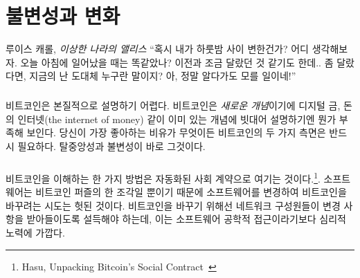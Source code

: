 \chapter{불변성과 변화}
\label{les:1}

\begin{chapquote}{루이스 캐롤, \textit{이상한 나라의 앨리스}}
	\enquote{혹시 내가 하룻밤 사이 변한건가? 어디 생각해보자.
		오늘 아침에 일어났을 때는 똑같았나? 이전과 조금 달랐던 것 같기도 한데.. 
		좀 달랐다면, 지금의 난 도대체 누구란 말이지? 아, 정말 알다가도 모를 일이네!}
\end{chapquote}

\paragraph{}
비트코인은 본질적으로 설명하기 어렵다. 
비트코인은 \textit{새로운 개념}이기에 디지털 금, 돈의 인터넷(the internet of money) 같이 이미 있는 개념에 빗대어 설명하기엔 뭔가 부족해 보인다. 
당신이 가장 좋아하는 비유가 무엇이든 비트코인의 두 가지 측면은 반드시 필요하다. 탈중앙성과 불변성이 바로 그것이다.

\paragraph{}
비트코인을 이해하는 한 가지 방법은 자동화된 사회 계약으로 여기는 것이다.\footnote{Hasu, Unpacking Bitcoin's Social Contract~\cite{social-contract}}. 
소프트웨어는 비트코인 퍼즐의 한 조각일 뿐이기 때문에 소프트웨어를 변경하여 비트코인을 바꾸려는 시도는 헛된 것이다.
비트코인을 바꾸기 위해선 네트워크 구성원들이 변경 사항을 받아들이도록 설득해야 하는데, 이는 소프트웨어 공학적 접근이라기보다 심리적 노력에 가깝다.

